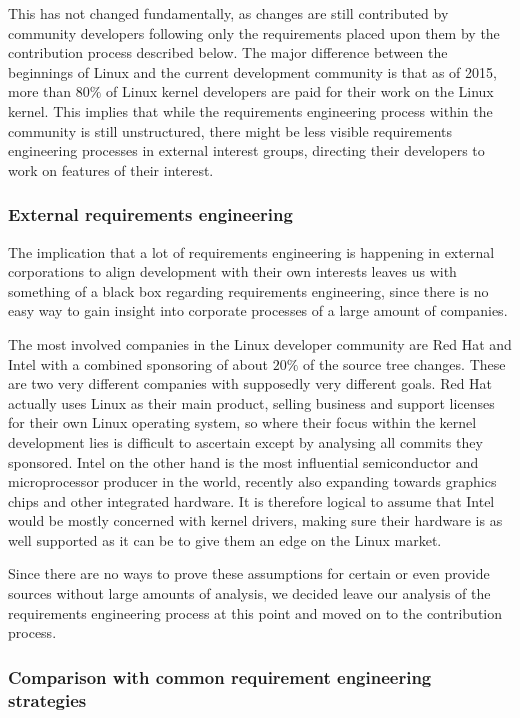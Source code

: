 \documentclass{sig-alternate-05-2015}
\begin{document}
This has not changed fundamentally, as changes are still contributed by community developers following only the requirements placed upon them by the contribution process described below.
The major difference between the beginnings of Linux and the current development community is that as of 2015, more than \(80\%\) of Linux kernel developers are paid for their work on the Linux kernel\cite{corbet2015linux}.
This implies that while the requirements engineering process within the community is still unstructured, there might be less visible requirements engineering processes in external interest groups, directing their developers to work on features of their interest.

\subsubsection{External requirements engineering}

The implication that a lot of requirements engineering is happening in external corporations to align development with their own interests leaves us with something of a black box regarding requirements engineering, since there is no easy way to gain insight into corporate processes of a large amount of companies.

The most involved companies in the Linux developer community are Red Hat and Intel with a combined sponsoring of about \(20\%\) of the source tree changes.
These are two very different companies with supposedly very different goals.
Red Hat actually uses Linux as their main product, selling business and support licenses for their own Linux operating system, so where their focus within the kernel development lies is difficult to ascertain except by analysing all commits they sponsored.
Intel on the other hand is the most influential semiconductor and microprocessor producer in the world, recently also expanding towards graphics chips and other integrated hardware.
It is therefore logical to assume that Intel would be mostly concerned with kernel drivers, making sure their hardware is as well supported as it can be to give them an edge on the Linux market.

Since there are no ways to prove these assumptions for certain or even provide sources without large amounts of analysis, we decided leave our analysis of the requirements engineering process at this point and moved on to the contribution process.

\subsubsection{Comparison with common requirement engineering strategies}
\end{document}

